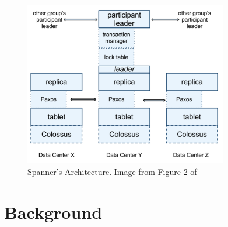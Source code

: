 \documentclass[10pt,twocolumn]{article}
\begin{document}
\begin{figure}[!b]
  \begin{center}
    \includegraphics[width=3.5in]{Images/Spanner_Arch.png}
  \end{center}

  \caption{\small Spanner's Architecture. Image from Figure 2 of \cite{corbett_spanner:_2012} }
  \label{Spanner_Arch}
\end{figure}

\section{Background}
\end{document}
